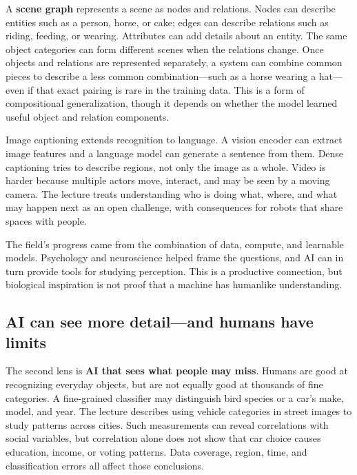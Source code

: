 A \textbf{scene graph} represents a scene as nodes and relations. Nodes can describe entities such as a person, horse, or cake; edges can describe relations such as riding, feeding, or wearing. Attributes can add details about an entity. The same object categories can form different scenes when the relations change. Once objects and relations are represented separately, a system can combine common pieces to describe a less common combination---such as a horse wearing a hat---even if that exact pairing is rare in the training data. This is a form of compositional generalization, though it depends on whether the model learned useful object and relation components.

Image captioning extends recognition to language. A vision encoder can extract image features and a language model can generate a sentence from them. Dense captioning tries to describe regions, not only the image as a whole. Video is harder because multiple actors move, interact, and may be seen by a moving camera. The lecture treats understanding who is doing what, where, and what may happen next as an open challenge, with consequences for robots that share spaces with people.

The field's progress came from the combination of data, compute, and learnable models. Psychology and neuroscience helped frame the questions, and AI can in turn provide tools for studying perception. This is a productive connection, but biological inspiration is not proof that a machine has humanlike understanding.

\subsection{AI can see more detail---and humans have limits}\label{04-visual-computing-ii-ch034-ai-can-see-more-detailand-humans-have-limits}

\hypertarget{04-visual-computing-ii-ch034-ai-can-see-more-detailand-humans-have-limits}{}

The second lens is \textbf{AI that sees what people may miss}. Humans are good at recognizing everyday objects, but are not equally good at thousands of fine categories. A fine-grained classifier may distinguish bird species or a car's make, model, and year. The lecture describes using vehicle categories in street images to study patterns across cities. Such measurements can reveal correlations with social variables, but correlation alone does not show that car choice causes education, income, or voting patterns. Data coverage, region, time, and classification errors all affect those conclusions.

